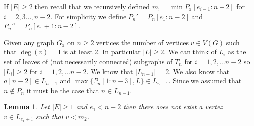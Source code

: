 \documentclass[10pt]{article} %
\newtheorem{lem}[thm]{Lemma}
\theoremstyle{definition}
\DeclareMathOperator{\Pos}{Pos}
\begin{document}
If $|E| \geq 2$ then recall that we recursively defined $m_{i} = \min P_{n}[e_{i-1}:n-2]$ for $i = 2,3\dots,n-2$.  For simplicity we define  $P_{n}' = P_{n}[e_{1}:n-2] $ and $P_{n}'' = P_{n}[e_{1} + 1:n-2]$. %

Given any graph $G_{n}$ on $n \geq 2$ vertices the number of vertices $v \in V(G)$ such that $\deg(v) = 1$ is at least 2.  In particular $|L| \geq 2$. We can think of $L_{i}$ as the set of leaves of (not necessarily connected) subgraphs of $T_{n}$ for $i = 1,2,\dots n-2$ so $|L_{i}| \geq 2$ for $i = 1,2,\dots n-2$.  We know that $|L_{n-1}|$ = 2. We also know that  $a[n-2] \in L_{n-1}$ and $\max \{P_{n}[1:n-3], L\} \in L_{n-1}$.  Since we assumed that $n \notin P_{n}$ it must be the case that $n \in L_{n-1}$.  

\begin{lem}\label{lem:1}
Let $|E| \geq 1$ and $e_{1} < n-2$ then there does not exist a vertex $v \in L_{e_{1} + 1}$ such that $v < m_{2}$.     
\end{lem}
\end{document}
